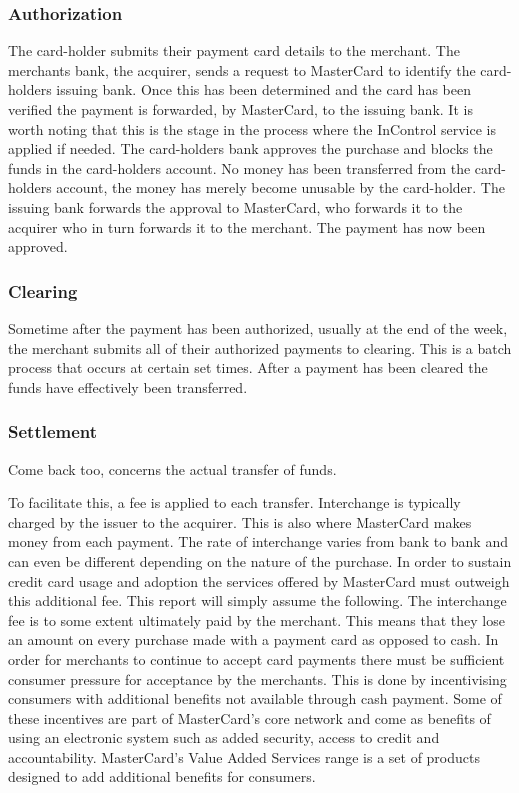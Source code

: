 \documentclass[a4paper, 11pt, titlepage]{article}
\begin{document}
\subsubsection{Authorization} The card-holder submits their payment card details to the merchant. The merchants bank, the acquirer, sends a request to MasterCard to identify the card-holders issuing bank. Once this has been determined and the card has been verified the payment is forwarded, by MasterCard, to the issuing bank. It is worth noting that this is the stage in the process where the InControl service is applied if needed. The card-holders bank approves the purchase and blocks the funds in the card-holders account. No money has been transferred from the card-holders account, the money has merely become unusable by the card-holder. The issuing bank forwards the approval to MasterCard, who forwards it to the acquirer who in turn forwards it to the merchant. The payment has now been approved.  
\subsubsection{Clearing} Sometime after the payment has been authorized, usually at the end of the week, the merchant submits all of their authorized payments to clearing. This is a batch process that occurs at certain set times. After a payment has been cleared the funds have effectively been transferred. 
\subsubsection{Settlement} Come back too, concerns the actual transfer of funds. 
 
To facilitate this, a fee is applied to each transfer. Interchange is typically charged by the issuer to the acquirer. This is also where MasterCard makes money from each payment. The rate of interchange varies from bank to bank and can even be different depending on the nature of the purchase. In order to sustain credit card usage and adoption the services offered by MasterCard must outweigh this additional fee. This report will simply assume the following. The interchange fee is to some extent ultimately paid by the merchant. This means that they lose an amount on every purchase made with a payment card as opposed to cash. In order for merchants to continue to accept card payments there must be sufficient consumer pressure for acceptance by the merchants. This is done by incentivising consumers with additional benefits not available through cash payment. Some of these incentives are part of MasterCard’s core network and come as benefits of using an electronic system such as added security, access to credit and accountability. MasterCard’s Value Added Services range is a set of products designed to add additional benefits for consumers. 
\cite{mcInterchange} 
 
\end{document}
